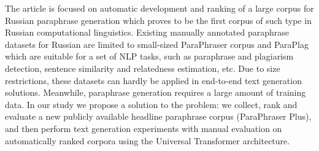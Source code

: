The article is focused on automatic development and ranking of a large corpus for Russian paraphrase generation which proves to be the first corpus of such type in Russian computational linguistics. Existing manually annotated paraphrase datasets for Russian are limited to small-sized ParaPhraser corpus and ParaPlag which are suitable for a set of NLP tasks, such as paraphrase and plagiarism detection, sentence similarity and relatedness estimation, etc. Due to size restrictions, these datasets can hardly be applied in end-to-end text generation solutions. Meanwhile, paraphrase generation requires a large amount of training data. In our study we propose a solution to the problem: we collect, rank and evaluate a new publicly available headline paraphrase corpus (ParaPhraser Plus), and then perform text generation experiments with manual evaluation on automatically ranked corpora using the Universal Transformer architecture.
